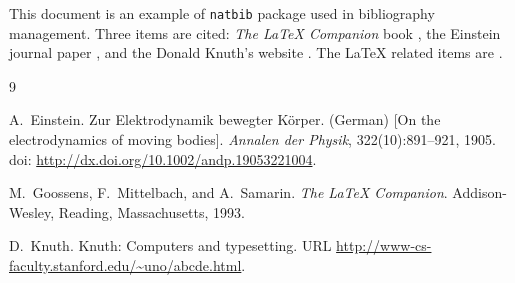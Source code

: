 \documentclass{article}
\begin{document}
This document is an example of \texttt{natbib} package used in bibliography
management.  Three items are cited: \textit{The \LaTeX{} Companion} book
\citep{goossens1993}, the Einstein journal paper \citep{einstein1905}, and the
Donald Knuth's website \citep{knuth_web}.  The \LaTeX{} related items are
\citep{goossens1993, knuth_web}.

\begin{thebibliography}{9}

A.~Einstein.
\newblock Zur Elektrodynamik bewegter K{\"o}rper. (German) [On the
  electrodynamics of moving bodies].
\newblock \textit{Annalen der Physik}, 322(10):891--921, 1905.
\newblock doi: \url{http://dx.doi.org/10.1002/andp.19053221004}.

M.~Goossens, F.~Mittelbach, and A.~Samarin.
\newblock \textit{The \LaTeX{} Companion}.
\newblock Addison-Wesley, Reading, Massachusetts, 1993.

D.~Knuth.
\newblock Knuth: Computers and typesetting.
\newblock URL \url{http://www-cs-faculty.stanford.edu/~uno/abcde.html}.

\end{thebibliography}
\end{document}
